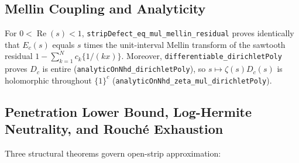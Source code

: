 \documentclass[11pt,a4paper]{article}
\theoremstyle{definition}
\begin{document}
\subsection{Mellin Coupling and Analyticity}
For $0 < \operatorname{Re}(s) < 1$, \texttt{stripDefect\_\allowbreak eq\_\allowbreak mul\_\allowbreak mellin\_\allowbreak residual} proves identically that $E_c(s)$ equals $s$ times the unit-interval Mellin transform of the sawtooth residual $1 - \sum_{k=1}^N c_k \{1/(kx)\}$. Moreover, \texttt{differentiable\_\allowbreak dirichletPoly} proves $D_c$ is entire (\texttt{analyticOnNhd\_\allowbreak dirichletPoly}), so $s \mapsto \zeta(s) D_c(s)$ is holomorphic throughout $\{1\}^c$ (\texttt{analyticOnNhd\_\allowbreak zeta\_\allowbreak mul\_\allowbreak dirichletPoly}).

\subsection{Penetration Lower Bound, Log-Hermite Neutrality, and Rouch\'e Exhaustion}
Three structural theorems govern open-strip approximation:
\end{document}
